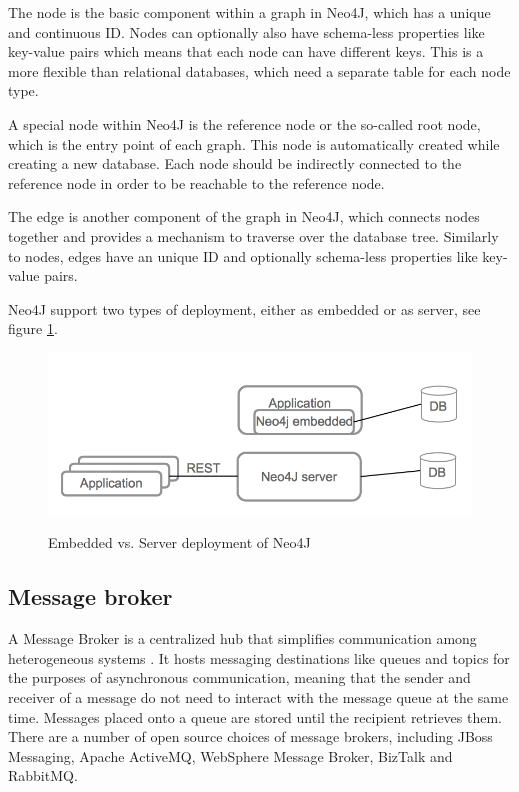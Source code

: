 The node is the basic component within a graph in Neo4J, which has a unique and continuous ID. Nodes can optionally also have schema-less properties like key-value pairs which means that each node can have different keys. This is a more flexible than relational databases, which need a separate table for each node type. 

A special node within Neo4J is the reference node or the so-called root node, which is the entry point of each graph. This node is automatically created while creating a new database. Each node should be indirectly connected to the reference node in order to be reachable to the reference node.

The edge is another component of the graph in Neo4J, which connects nodes together and provides a mechanism to traverse over the database tree. Similarly to nodes, edges have an unique ID and optionally schema-less properties like key-value pairs.

Neo4J support two types of deployment, either as embedded or as server, see figure \ref{fig:neo4j}.

\begin{figure}[htb]
  \centering
  \includegraphics[scale=0.4]{neo4j_n.png}\\
  \caption{Embedded  vs. Server deployment of Neo4J}
  \label{fig:neo4j}
\end{figure}

\subsection{Message broker\label{sec:back_me_mid}}
A Message Broker is a centralized hub that simplifies communication among heterogeneous systems \cite{books/daglib/0013993}. It hosts messaging destinations like queues and topics for the purposes of asynchronous communication, meaning that the sender and receiver of a message do not need to interact with the message queue at the same time. Messages placed onto a queue are stored until the recipient retrieves them. There are a number of open source choices of message brokers, including JBoss Messaging, Apache ActiveMQ, WebSphere Message Broker, BizTalk and RabbitMQ.

